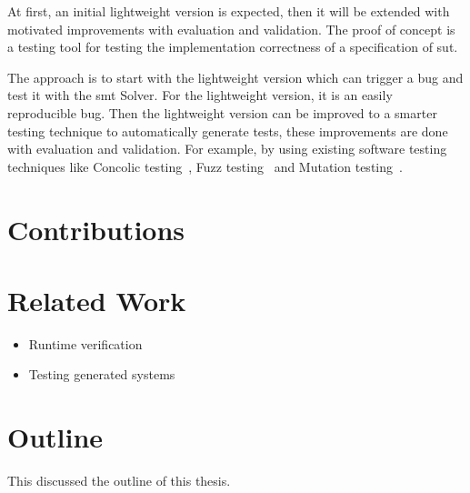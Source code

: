 At first, an initial lightweight version is expected, then it will be extended with motivated
improvements with evaluation and validation. The proof of concept is a testing
tool for testing the implementation correctness of a specification of \gls{sut}.

The
approach is to start with the lightweight version which can trigger a bug and
test it with the \gls{smt} Solver. For the lightweight version, it is an easily
reproducible bug. Then the lightweight version can be improved to a smarter
testing technique to automatically generate tests, these improvements are done
with evaluation and validation. For example, by using existing software testing
techniques like Concolic testing~\cite{sen2007concolic}, Fuzz testing~\cite{godefroid2008automated} and Mutation testing~\cite{jia2011analysis}.

\section{Contributions}
%

\section{Related Work}
\begin{itemize}
  \item Runtime verification
  \item Testing generated systems
\end{itemize}

\section{Outline}
This discussed the outline of this thesis.
